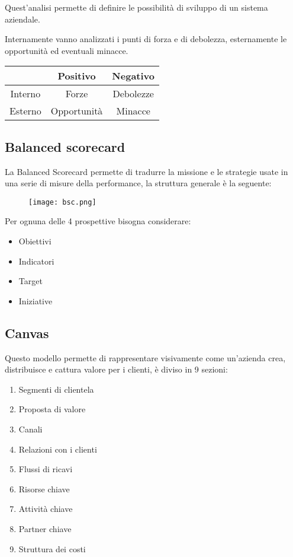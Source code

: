 \documentclass{article}
\begin{document}
Quest'analisi permette di definire le possibilità di sviluppo di un sistema aziendale.\newline

\noindent Internamente vanno analizzati i punti di forza e di debolezza, esternamente le opportunità ed eventuali minacce.

\begin{table}[ht]
    \centering
    \begin{tabular}{|c|c|c|}
        \hline
         & Positivo & Negativo\\
         \hline
        Interno & Forze & Debolezze\\
         \hline
        Esterno & Opportunità & Minacce\\
         \hline
    \end{tabular}
\end{table}

\subsection{Balanced scorecard}

La Balanced Scorecard permette di tradurre la missione e le strategie usate in una serie di misure della performance, la struttura generale è la seguente:\newline

\begin{figure}[ht]
    \centering
    \texttt{[image: bsc.png]}
\end{figure}

\noindent Per ognuna delle 4 prospettive bisogna considerare:
\begin{multicols}{2}
\begin{itemize}
    \item Obiettivi
    \item Indicatori
    \item Target
    \item Iniziative
\end{itemize}
\end{multicols}

\subsection{Canvas}

Questo modello permette di rappresentare visivamente come un'azienda crea, distribuisce e cattura valore per i clienti, è diviso in 9 sezioni:
\begin{enumerate}
    \item Segmenti di clientela
    \item Proposta di valore
    \item Canali
    \item Relazioni con i clienti
    \item Flussi di ricavi
    \item Risorse chiave
    \item Attività chiave
    \item Partner chiave
    \item Struttura dei costi\newline
\end{enumerate}
\end{document}
